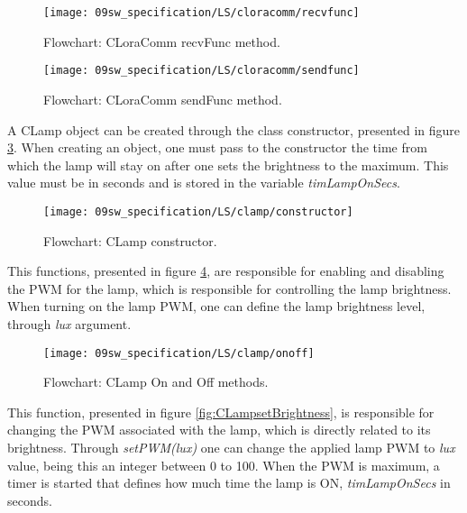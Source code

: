 \begin{figure}[H]
	\centering		\texttt{[image: 09sw\_specification/LS/cloracomm/recvfunc]}
	\caption{Flowchart: CLoraComm recvFunc method.}
	\label{fig:CLoraCommrecvfunc}
\end{figure}

\begin{figure}[H]
	\centering
	\texttt{[image: 09sw\_specification/LS/cloracomm/sendfunc]}
	\caption{Flowchart: CLoraComm sendFunc method.}
	\label{fig:CLoraCommsendfunc}
\end{figure}


\clearpage
{}

A CLamp object can be created through the class constructor, presented in figure \ref{fig:CLampconstructor}. When creating an object, one must pass to the constructor the time from which the lamp will stay on after one sets the brightness to the maximum. This value must be in seconds and is stored in the variable \textit{timLampOnSecs}.

\begin{figure}[H]
	\centering	
	\texttt{[image: 09sw\_specification/LS/clamp/constructor]}
	\caption{Flowchart: CLamp constructor.}
	\label{fig:CLampconstructor}
\end{figure}

This functions, presented in figure \ref{fig:CLamponoff}, are responsible for enabling and disabling the PWM for the lamp, which is responsible for controlling the lamp brightness. When turning on the lamp PWM, one can define the lamp brightness level, through \textit{lux} argument.

\begin{figure}[H]
	\centering	
	\texttt{[image: 09sw\_specification/LS/clamp/onoff]}
	\caption{Flowchart: CLamp On and Off methods.}
	\label{fig:CLamponoff}
\end{figure}

\clearpage
This function, presented in figure \ref{fig:CLampsetBrightness}, is responsible for changing the PWM associated with the lamp, which is directly related to its brightness. Through \textit{setPWM(lux)} one can change the applied lamp PWM to \textit{lux} value, being this an integer between 0 to 100. When the PWM is maximum, a timer is started that defines how much time the lamp is ON, \textit{timLampOnSecs} in seconds.

